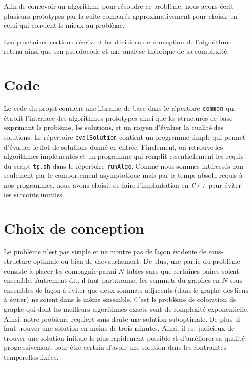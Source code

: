 \documentclass[letterpaper,12pt,final]{article}
\begin{document}
Afin de concevoir un algorithme pour résoudre ce problème, nous avons
écrit plusieurs prototypes par la suite comparés approximativement
pour choisir un celui qui convient le mieux au problème.

Les prochaines sections décrivent les décisions de conception de
l'algorithme retenu ainsi que son pseudocode et une analyse théorique
de sa complexité.

\section{Code}

Le code du projet contient une librairie de base dans le répertoire
\lstinline|common| qui établit l'interface des algorithmes prototypes
ainsi que les structures de base exprimant le problème, les solutions,
et un moyen d'évaluer la qualité des solutions.  Le répertoire
\lstinline|evalSolution| contient un programme simple qui permet
d'évaluer le flot de solutions donné en entrée.  Finalement, on
retrouve les algorithmes implémentés et un programme qui remplit
essentiellement les requis du script \lstinline|tp.sh| dans le
répertoire \lstinline|runAlgo|.  Comme nous sommes intéressés non
seulement par le comportement asymptotique mais par le temps absolu
requis à nos programmes, nous avons choisit de faire l'implantation en
\textit{C++} pour éviter les surcoûts inutiles.

\section{Choix de conception}

Le problème n'est pas simple et ne montre pas de façon évidente de
sous-structure optimale ou bien de chevauchement.  De plus, une partie
du problème consiste à placer les compagnie parmi $N$ tables sans que
certaines paires soient ensemble.  Autrement dit, il faut partitionner
les sommets du graphes en $N$ sous-ensembles de façon à éviter que
deux sommets adjacents (dans le graphe des liens à éviter) ne soient
dans le même ensemble.  C'est le problème de coloration de graphe qui
dont les meilleurs algorithmes exacts sont de complexité
exponentielle.  Ainsi, notre problème requiert sans doute une solution
suboptimale.  De plus, il faut trouver une solution en moins de trois
minutes. Ainsi, il est judicieux de trouver une solution initiale le
plus rapidement possible et d'améliorer sa qualité progressivement
pour être certain d'avoir une solution dans les contraintes
temporelles fixées.
\end{document}
